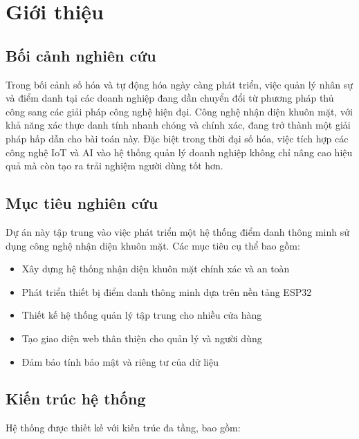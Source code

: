 \section{Giới thiệu}

\subsection{Bối cảnh nghiên cứu}
\hspace{0.5cm}Trong bối cảnh số hóa và tự động hóa ngày càng phát triển, việc quản lý nhân sự và điểm danh tại các doanh nghiệp đang dần chuyển đổi từ phương pháp thủ công sang các giải pháp công nghệ hiện đại. Công nghệ nhận diện khuôn mặt, với khả năng xác thực danh tính nhanh chóng và chính xác, đang trở thành một giải pháp hấp dẫn cho bài toán này. Đặc biệt trong thời đại số hóa, việc tích hợp các công nghệ IoT và AI vào hệ thống quản lý doanh nghiệp không chỉ nâng cao hiệu quả mà còn tạo ra trải nghiệm người dùng tốt hơn.

\subsection{Mục tiêu nghiên cứu}
\hspace{0.5cm}Dự án này tập trung vào việc phát triển một hệ thống điểm danh thông minh sử dụng công nghệ nhận diện khuôn mặt. Các mục tiêu cụ thể bao gồm:

\begin{itemize}
    \item Xây dựng hệ thống nhận diện khuôn mặt chính xác và an toàn
    \item Phát triển thiết bị điểm danh thông minh dựa trên nền tảng ESP32
    \item Thiết kế hệ thống quản lý tập trung cho nhiều cửa hàng
    \item Tạo giao diện web thân thiện cho quản lý và người dùng
    \item Đảm bảo tính bảo mật và riêng tư của dữ liệu
\end{itemize}

\subsection{Kiến trúc hệ thống}
\hspace{0.5cm}Hệ thống được thiết kế với kiến trúc đa tầng, bao gồm:

